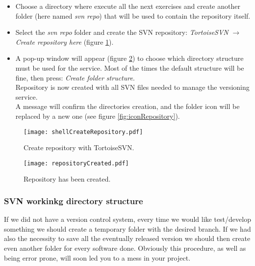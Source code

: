 \begin{itemize}
    \item Choose a directory where execute all the next exercises and create another folder (here named \textit{svn repo}) that will be used to contain the repository itself.
    
    \item Select the \textit{svn repo} folder and create the SVN repository: \textit{TortoiseSVN} $\rightarrow$ \textit{Create repository here} (figure \ref{fig:shellCreateRepository}).
    
    \item A pop-up window will appear (figure \ref{fig:repositoryCreated}) to choose which directory structure must be used for the service. Most of the times the default structure will be fine, then press: \textit{Create folder structure}.\\
    Repository is now created with all SVN files needed to manage the versioning service.\\
    A message will confirm the directories creation, and the folder icon will be replaced by a new one (see figure \ref{fig:iconRepository}).
    

\end{itemize}

\begin{figure}[htbp]
    \centering
    \texttt{[image: shellCreateRepository.pdf]}
    \caption{Create repository with TortoiseSVN.}
    \label{fig:shellCreateRepository}
\end{figure}

\begin{figure}[htbp]
    \centering
    \texttt{[image: repositoryCreated.pdf]}
    \caption{Repository has been created.}
    \label{fig:repositoryCreated}
\end{figure}





\subsubsection{SVN workinkg directory structure}
\label{subsubsection:SVNWorkinkgDirectoryStructure}

If we did not have a version control system, every time we would like test/develop something we should create a temporary folder with the desired branch.
If we had also the necessity to save all the eventually released version we should then create even another folder for every software done. Obviously this procedure, as well as being error prone, will soon led you to a mess in your project.\\

